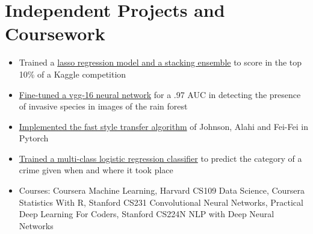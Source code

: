\documentclass[11pt]{article}
\begin{document}
	\section{Independent Projects and Coursework}
		\begin{itemize}[noitemsep]
			\item Trained a \href{https://github.com/ryankresse/ames_housing}{lasso regression model and a stacking ensemble} to score in the top 10\% of a Kaggle competition
			\item \href{https://github.com/ryankresse/invasive_species}{Fine-tuned a vgg-16 neural network} for a .97 AUC in detecting the presence of invasive species in images of the rain forest 
			\item \href{https://github.com/ryankresse/fast_style_transfer_pytorch}{Implemented the fast style transfer algorithm} of Johnson, Alahi and Fei-Fei in Pytorch
			\item \href{https://github.com/ryankresse/sf-crime}{Trained a multi-class logistic regression classifier} to predict the category of a crime given when and where it took place
			\item Courses: Coursera Machine Learning, Harvard CS109 Data Science, Coursera Statistics With R, Stanford CS231 Convolutional Neural Networks, Practical Deep Learning For Coders, Stanford CS224N NLP with Deep Neural Networks
			\begin{comment}
			\begin{itemize}[noitemsep]
				\item Coursera: Machine Learning 
				\item Harvard CS109: Data Science
				\item Coursera: Statistics With R 
				\item Stanford CS231: Convolutional Neural Networks
				\item Practical Deep Learning For Coders 
				\item Stanford CS224N: NLP with Deep Neural Networks
			\end{itemize}
			\end{comment}
		\end{itemize}
\end{document}
